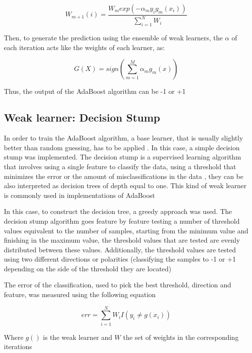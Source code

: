 \documentclass[11pt,twocolumn,letterpaper]{article}
\begin{document}
\begin{equation}
	W_{m+1} (i) = \frac{W_m exp(-\alpha_m y_i g_m(x_i))}{\sum_{i=1}^{N} W_i}
\end{equation}

Then, to generate the prediction using the ensemble of weak learners, the $\alpha$ of each iteration acts like the weights of each learner, as:

\begin{equation}
	G(X) = sign(\sum_{m=1}^{M} \alpha_m g_m(x))
\end{equation}

Thus, the output of the AdaBoost algorithm can be -1 or +1

\subsection{Weak learner: Decision Stump}

In order to train the AdaBoost algorithm, a base learner, that is usually slightly better than random guessing, has to be applied \cite{Freund1999}. In this case, a simple decision stump was implemented. The decision stump is a supervised learning algorithm that involves using a single feature to classify the data, using a threshold that minimizes the error or the amount of misclassifications in the data \cite{Oliver1994}, they can be also interpreted as decision trees of depth equal to one. This kind of weak learner is commonly used in implementations of AdaBoost \cite{Hastie2009}

In this case, to construct the decision tree, a greedy approach was used. The decision stump algorithm goes feature by feature testing a number of threshold values equivalent to the number of samples, starting from the minimum value and finishing in the maximum value, the threshold values that are tested are evenly distributed between these values. Additionally, the threshold values are tested using two different directions or polarities (classifying the samples to -1 or +1 depending on the side of the threshold they are located)

The error of the classification, used to pick the best threshold, direction and feature, was measured using the following equation \cite{Freund1999}

\begin{equation}
	err = \sum_{i=1}^{N} W_i I(y_i \neq g(x_i))
\end{equation}

Where $g()$ is the weak learner and $W$ the set of weights in the corresponding iterations
\end{document}
